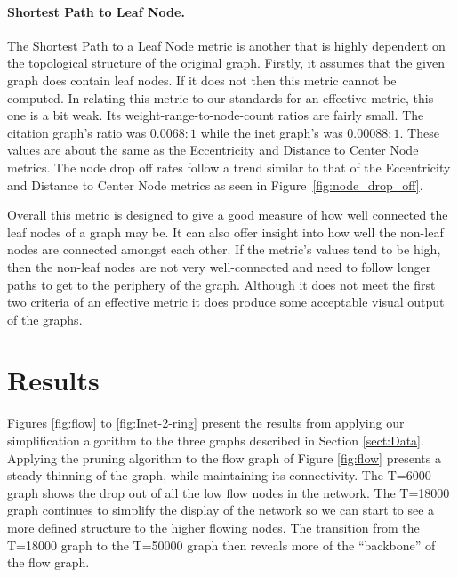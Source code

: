 \paragraph*{Shortest Path to Leaf Node.}
The Shortest Path to a Leaf Node metric is another that is highly dependent on the topological structure of the original graph.  Firstly, it assumes that the given graph does contain leaf nodes.  If it does not then this metric cannot be computed.  In relating this metric to our standards for an effective metric, this one is a bit weak.  Its weight-range-to-node-count ratios are fairly small.  The citation graph's ratio was $0.0068:1$ while the inet graph's was $0.00088:1$.  These values are about the same as the Eccentricity and Distance to Center Node metrics.  The node drop off rates follow a trend similar to that of the Eccentricity and Distance to Center Node metrics as seen in Figure~\ref{fig:node_drop_off}.

Overall this metric is designed to give a good measure of how well connected the leaf nodes of a graph may be.  It can also offer insight into how well the non-leaf nodes are connected amongst each other. If the metric's values tend to be high, then the non-leaf nodes are not very well-connected and need to follow longer paths to get to the periphery of the graph.  Although it does not meet the first two criteria of an effective metric it does produce some acceptable visual output of the graphs.

\section{Results}
\label{sect:Results}

Figures \ref{fig:flow} to \ref{fig:Inet-2-ring} present the results from applying our simplification algorithm to the three graphs described in Section \ref{sect:Data}.  Applying the pruning algorithm to the flow graph of Figure \ref{fig:flow} presents a steady thinning of the graph, while maintaining its connectivity. The T=6000 graph shows the drop out of all the low flow nodes in the network. The T=18000 graph continues to simplify the display of the network so we can start to see a more defined structure to the higher flowing nodes.  The transition from the T=18000 graph to the T=50000 graph then reveals more of the ``backbone'' of the flow graph.


